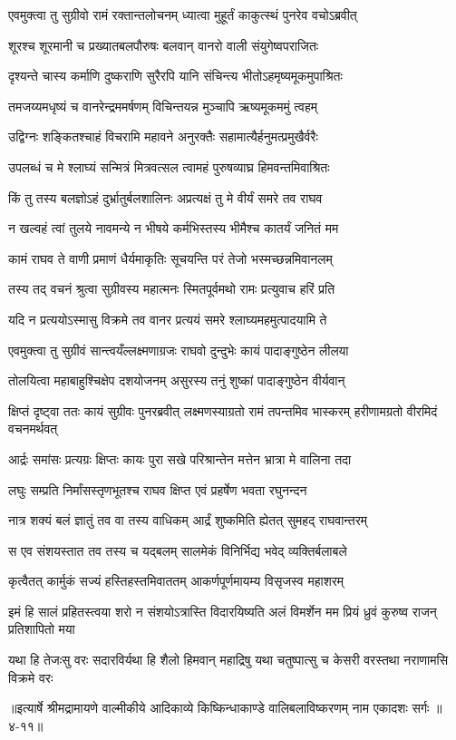 \twolineshloka
{एवमुक्त्वा तु सुग्रीवो रामं रक्तान्तलोचनम्}
{ध्यात्वा मुहूर्तं काकुत्स्थं पुनरेव वचोऽब्रवीत्} %

\twolineshloka
{शूरश्च शूरमानी च प्रख्यातबलपौरुषः}
{बलवान् वानरो वाली संयुगेष्वपराजितः} %

\twolineshloka
{दृश्यन्ते चास्य कर्माणि दुष्कराणि सुरैरपि}
{यानि संचिन्त्य भीतोऽहमृष्यमूकमुपाश्रितः} %

\twolineshloka
{तमजय्यमधृष्यं च वानरेन्द्रममर्षणम्}
{विचिन्तयन्न मुञ्चापि ऋष्यमूकममुं त्वहम्} %

\twolineshloka
{उद्विग्नः शङ्कितश्चाहं विचरामि महावने}
{अनुरक्तैः सहामात्यैर्हनुमत्प्रमुखैर्वरैः} %

\twolineshloka
{उपलब्धं च मे श्लाघ्यं सन्मित्रं मित्रवत्सल}
{त्वामहं पुरुषव्याघ्र हिमवन्तमिवाश्रितः} %

\twolineshloka
{किं तु तस्य बलज्ञोऽहं दुर्भ्रातुर्बलशालिनः}
{अप्रत्यक्षं तु मे वीर्यं समरे तव राघव} %

\twolineshloka
{न खल्वहं त्वां तुलये नावमन्ये न भीषये}
{कर्मभिस्तस्य भीमैश्च कातर्यं जनितं मम} %

\twolineshloka
{कामं राघव ते वाणी प्रमाणं धैर्यमाकृतिः}
{सूचयन्ति परं तेजो भस्मच्छन्नमिवानलम्} %

\twolineshloka
{तस्य तद् वचनं श्रुत्वा सुग्रीवस्य महात्मनः}
{स्मितपूर्वमथो रामः प्रत्युवाच हरिं प्रति} %

\twolineshloka
{यदि न प्रत्ययोऽस्मासु विक्रमे तव वानर}
{प्रत्ययं समरे श्लाघ्यमहमुत्पादयामि ते} %

\twolineshloka
{एवमुक्त्वा तु सुग्रीवं सान्त्वयँल्लक्ष्मणाग्रजः}
{राघवो दुन्दुभेः कायं पादाङ्गुष्ठेन लीलया} %

\twolineshloka
{तोलयित्वा महाबाहुश्चिक्षेप दशयोजनम्}
{असुरस्य तनुं शुष्कां पादाङ्गुष्ठेन वीर्यवान्} %

\threelineshloka
{क्षिप्तं दृष्ट्वा ततः कायं सुग्रीवः पुनरब्रवीत्}
{लक्ष्मणस्याग्रतो रामं तपन्तमिव भास्करम्}
{हरीणामग्रतो वीरमिदं वचनमर्थवत्} %

\twolineshloka
{आर्द्रः समांसः प्रत्यग्रः क्षिप्तः कायः पुरा सखे}
{परिश्रान्तेन मत्तेन भ्रात्रा मे वालिना तदा} %

\twolineshloka
{लघुः सम्प्रति निर्मांसस्तृणभूतश्च राघव}
{क्षिप्त एवं प्रहर्षेण भवता रघुनन्दन} %

\twolineshloka
{नात्र शक्यं बलं ज्ञातुं तव वा तस्य वाधिकम्}
{आर्द्रं शुष्कमिति ह्येतत् सुमहद् राघवान्तरम्} %

\twolineshloka
{स एव संशयस्तात तव तस्य च यद्बलम्}
{सालमेकं विनिर्भिद्य भवेद् व्यक्तिर्बलाबले} %

\twolineshloka
{कृत्वैतत् कार्मुकं सज्यं हस्तिहस्तमिवाततम्}
{आकर्णपूर्णमायम्य विसृजस्व महाशरम्} %

\twolineshloka
{इमं हि सालं प्रहितस्त्वया शरो न संशयोऽत्रास्ति विदारयिष्यति}
{अलं विमर्शेन मम प्रियं ध्रुवं कुरुष्व राजन् प्रतिशापितो मया} %

\twolineshloka
{यथा हि तेजःसु वरः सदारविर्यथा हि शैलो हिमवान् महाद्रिषु}
{यथा चतुष्पात्सु च केसरी वरस्तथा नराणामसि विक्रमे वरः} %


॥इत्यार्षे श्रीमद्रामायणे वाल्मीकीये आदिकाव्ये किष्किन्धाकाण्डे वालिबलाविष्करणम् नाम एकादशः सर्गः ॥४-११॥
